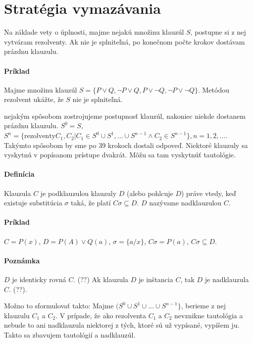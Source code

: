 \section{Stratégia vymazávania}
Na základe vety o úplnosti, majme nejakú množinu klauzúl $S$, postupne si z nej
vytváram rezolventy. Ak nie je splniteľná, po konečnom počte krokov dostávam
prázdnu klauzulu.

\paragraph{Príklad} Majme množinu klauzúl $S=\{P\lor Q, \neg P\lor Q, P \lor
\neg Q, \neg P \lor \neg Q\}$. Metódou rezolvent ukážte, že $S$ nie je
splniteľná.

\par nejakým spôsobom zostrojujeme postupnosť klauzúl, nakoniec niekde dostanem
prázdnu klauzulu. 
$S^0 = S$, $S^n = \{ \mbox{rezolventy} C_1, C_2 | C_1 \in S^0 \cup S^1,
\ldots \cup S^{n-1} \land C_2 \in S^{n-1}\}, n=1, 2, \ldots$. Takýmto spôsobom
by sme po $39$ krokoch dostali odpoveď. Niektoré klauzuly sa vyskytnú v
popísanom prístupe dvakrát. Môžu sa tam vyskytnúť tautológie.


\paragraph{Definícia} Klauzula $C$ je podklauzulou klauzuly $D$ (alebo pohlcuje
$D$) práve vtedy, keď existuje substitúcia $\sigma$ taká, že platí $C\sigma
\subseteq D$. $D$ nazývame nadklauzulou $C$.

\paragraph{Príklad} $C = P(x)$, $D = P(A) \lor Q(a)$, $\sigma = \{a/x\}$,
$C\sigma = P(a)$, $C\sigma \subseteq D$.

\paragraph{Poznámka} $D$ je identicky rovná $C$. (??)
Ak klauzula $D$ je inštancia $C$, tak $D$ je nadklauzula $C$. (??). 

\par
Možno to sformulovať takto: Majme $(S^0 \cup S^1 \cup \ldots \cup
S^{n-1}\}$, berieme z nej klauzulu $C_1$ a $C_2$. V prípade, že ako rezolventa
$C_1$ a $C_2$ nevznikne tautológia a nebude to ani nadklauzula niektorej z tých,
ktoré sú už vypísané, vypíšem ju. Takto sa zbavujem tautológií a nadklauzúl.

